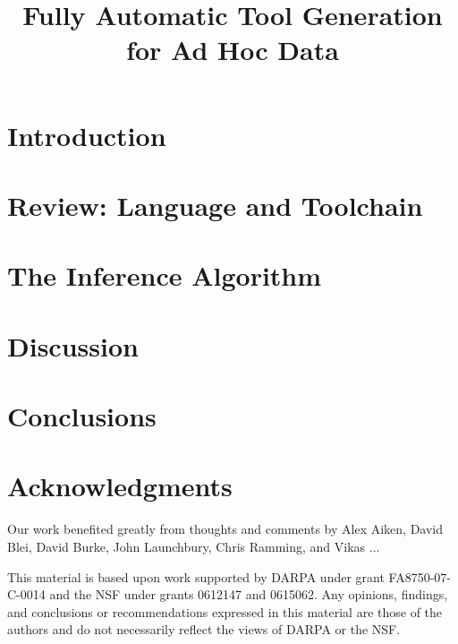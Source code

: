 \documentclass[nocopyrightspace]{sigplanconf}
\begin{document}
\title{Fully Automatic Tool Generation for Ad Hoc Data}

       {}
       {}
       {}
       {}


\maketitle{}

\begin{abstract}  

\end{abstract}

\section {Introduction}
\label{sec:intro}


\section{Review:  \pads{} Language and Toolchain}
\label{sec:review}


\section{The Inference Algorithm}
\label{sec:inference}


\section {Discussion}
\label{sec:discussion}



\section{Conclusions}


\section*{Acknowledgments}

Our work benefited greatly from thoughts and comments by
Alex Aiken, David Blei, David Burke, John Launchbury, Chris Ramming, 
and Vikas ...

This material is based upon work 
supported by DARPA under grant FA8750-07-C-0014
and the NSF
   under grants 0612147 and 0615062.
Any opinions, findings, and conclusions or recommendations
   expressed in this material are those of the authors and do not
   necessarily reflect the views of DARPA or the NSF.





\end{document}
